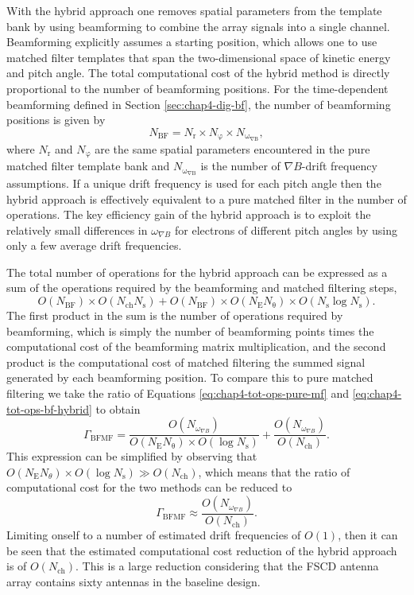 With the hybrid approach one removes spatial parameters from the template bank by using beamforming to combine the array signals into a single channel. Beamforming explicitly assumes a starting position, which allows one to use matched filter templates that span the two-dimensional space of kinetic energy and pitch angle. The total computational cost of the hybrid method is directly proportional to the number of beamforming positions. For the time-dependent beamforming defined in Section \ref{sec:chap4-dig-bf}, the number of beamforming positions is given by 
\begin{equation}
    N_\mathrm{BF}=N_\mathrm{r}\times N_\mathrm{\varphi}\times N_\mathrm{\omega_{\nabla B}},
\end{equation}
where $N_\mathrm{r}$ and $N_\mathrm{\varphi}$ are the same spatial parameters encountered in the pure matched filter template bank and $N_\mathrm{\omega_{\nabla B}}$ is the number of $\nabla B$-drift frequency assumptions. If a unique drift frequency is used for each pitch angle then the hybrid approach is effectively equivalent to a pure matched filter in the number of operations. The key efficiency gain of the hybrid approach is to exploit the relatively small differences in $\omega_{\nabla B}$ for electrons of different pitch angles by using only a few average drift frequencies. 

The total number of operations for the hybrid approach can be expressed as a sum of the operations required by the beamforming and matched filtering steps,
\begin{equation}
    O(N_\mathrm{BF})\times O(N_\mathrm{ch}N_\mathrm{s}) + O(N_\mathrm{BF})\times O(N_\mathrm{E}N_\mathrm{\theta})\times O(N_\mathrm{s}\log{N_\mathrm{s}}).
    \label{eq:chap4-tot-ops-bf-hybrid}
\end{equation}
The first product in the sum is the number of operations required by beamforming, which is simply the number of beamforming points times the computational cost of the beamforming matrix multiplication, and the second product is the computational cost of matched filtering the summed signal generated by each beamforming position. To compare this to pure matched filtering we take the ratio of Equations \ref{eq:chap4-tot-ops-pure-mf} and \ref{eq:chap4-tot-ops-bf-hybrid} to obtain 
\begin{equation}
    \Gamma_\mathrm{BFMF}=\frac{O(N_{\omega_{\nabla B}})}{O(N_\mathrm{E}N_\mathrm{\theta})\times O(\log{N_\mathrm{s}})} + \frac{O(N_{\omega_{\nabla B}})}{O(N_\mathrm{ch})}.
\end{equation}
This expression can be simplified by observing that $O(N_\mathrm{E}N_\theta)\times O(\log{N_\mathrm{s}})\gg O(N_\mathrm{ch})$, which means that the ratio of computational cost for the two methods can be reduced to
\begin{equation}
    \Gamma_\mathrm{BFMF}\approx \frac{O(N_{\omega_{\nabla B}})}{O(N_\mathrm{ch})}.
\end{equation} 
Limiting onself to a number of estimated drift frequencies of $O(1)$, then it can be seen that the estimated computational cost reduction of the hybrid approach is of $O(N_\mathrm{ch})$. This is a large reduction considering that the FSCD antenna array contains sixty antennas in the baseline design. 

